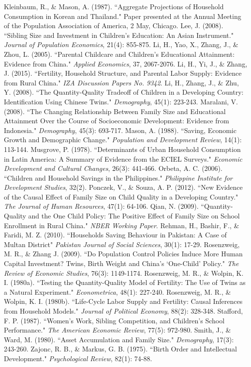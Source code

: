 \documentclass[12pt]{extarticle}
\begin{document}
\begin{thebibliography}{50}
\bibitem{}
Kleinbaum, R., \& Mason, A. (1987). ``Aggregate Projections of Household Consumption in Korean and Thailand." Paper presented at the Annual Meeting of the Population Association of America, 2 May, Chicago.
\bibitem{}
Lee, J. (2008). ``Sibling Size and Investment in Children’s Education: An Asian Instrument." \textit{Journal of Population Economics}, 21(4): 855-875.
\bibitem{}
Li, H., Yao, X., Zhang, J., \& Zhou, L. (2005). ``Parental Childcare and Children’s Educational Attainment: Evidence from China." \textit{Applied Economics}, 37, 2067-2076.
\bibitem{}
Li, H., Yi, J., \& Zhang, J. (2015). ``Fertility, Household Structure, and Parental Labor Supply: Evidence from Rural China." \textit{IZA Discussion Papers No. 9342}.
\bibitem{}
Li, H., Zhang, J., \& Zhu, Y. (2008). ``The Quantity-Quality Tradeoff of Children in a Developing Country: Identification Using Chinese Twins." \textit{Demography}, 45(1): 223-243.
\bibitem{}
Maralani, V. (2008). ``The Changing Relationship Between Family Size and Educational Attainment Over the Course of Socioeconomic Development: Evidence from Indonesia." \textit{Demography}, 45(3): 693-717.
\bibitem{}
Mason, A. (1988). ``Saving, Economic Growth and Demographic Change." \textit{Population and Development Review}, 14(1): 113-144.
\bibitem{}
Musgrove, P. (1978). ``Determinants of Urban Household Consumption in Latin America: A Summary of Evidence from the ECIEL Surveys." \textit{Economic Development and Cultural Changes}, 26(3): 441-466.
\bibitem{}
Orbeta, A. C. (2006). ``Children and Household Savings in the Philippines." \textit{Philippine Institute for Development Studies}, 32(2). 
\bibitem{}
Ponczek, V., \& Souza, A. P. (2012). ``New Evidence of the Causal Effect of Family Size on Child Quality in a Developing Country." \textit{The Journal of Human Resources}, 47(1): 64-106.
\bibitem{}
Qian, N. (2009). ``Quantity-Quality and the One Child Policy: The Positive Effect of Family Size on School Enrollment in Rural China." \textit{NBER Working Paper}.
\bibitem{}
Rehman, H., Bashir, F., \& Faridi, M. Z. (2010). ``Households Saving Behaviour in Pakistan: A Case of Multan District" \textit{Pakistan Journal of Social Sciences}, 30(1): 17-29. 
\bibitem{}
Rosenzweig, M. R., \& Zhang J. (2009). ``Do Population Control Policies Induce More Human Capital Investment? Twins, Birth Weight and China’s ‘One-Child’ Policy." \textit{The Review of Economic Studies}, 76(3): 1149-1174.
\bibitem{}
Rosenzweig, M. R., \& Wolpin, K. I. (1980a). ``Testing the Quantity-Quality Model of Fertility: The Use of Twins as a Natural Experiment." \textit{Econometrica}, 48(1): 227-240.
\bibitem{}
Rosenzweig, M. R., \& Wolpin, K. I. (1980b). ``Life-Cycle Labor Supply and Fertility: Causal Inferences from Household Models." \textit{Journal of Political Economy}, 88(2): 328-348.
\bibitem{}
Stafford, F. P. (1987). ``Women’s Work, Sibling Competition, and Children’s School Performance." \textit{The American Economic Review}, 77(5): 972-980.
\bibitem{}
Smith, J., \& Ward, M. (1980). ``Asset Accumulation and Family Size." \textit{Demography}, 17(3): 243-260.
\bibitem{}
Zajonc, R. B., \& Markus, G. B. (1975). ``Birth Order and Intellectual Development." \textit{Psychological Review}, 82(1): 74-88.
\end{thebibliography}
\pagebreak
\end{document}
